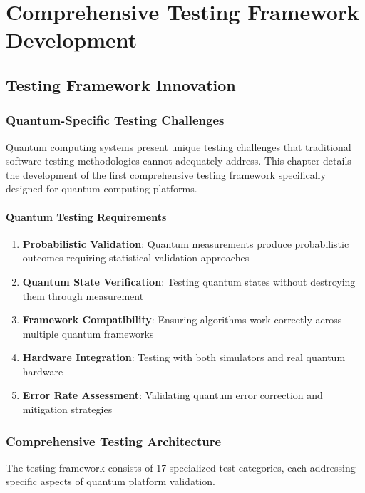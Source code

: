 \documentclass[12pt,a4paper]{report}
\begin{document}
\chapter{Comprehensive Testing Framework Development}

\section{Testing Framework Innovation}

\subsection{Quantum-Specific Testing Challenges}

Quantum computing systems present unique testing challenges that traditional software testing methodologies cannot adequately address. This chapter details the development of the first comprehensive testing framework specifically designed for quantum computing platforms.

\subsubsection{Quantum Testing Requirements}

\begin{enumerate}
\item \textbf{Probabilistic Validation}: Quantum measurements produce probabilistic outcomes requiring statistical validation approaches
\item \textbf{Quantum State Verification}: Testing quantum states without destroying them through measurement
\item \textbf{Framework Compatibility}: Ensuring algorithms work correctly across multiple quantum frameworks
\item \textbf{Hardware Integration}: Testing with both simulators and real quantum hardware
\item \textbf{Error Rate Assessment}: Validating quantum error correction and mitigation strategies
\end{enumerate}

\subsection{Comprehensive Testing Architecture}

The testing framework consists of 17 specialized test categories, each addressing specific aspects of quantum platform validation.
\end{document}
